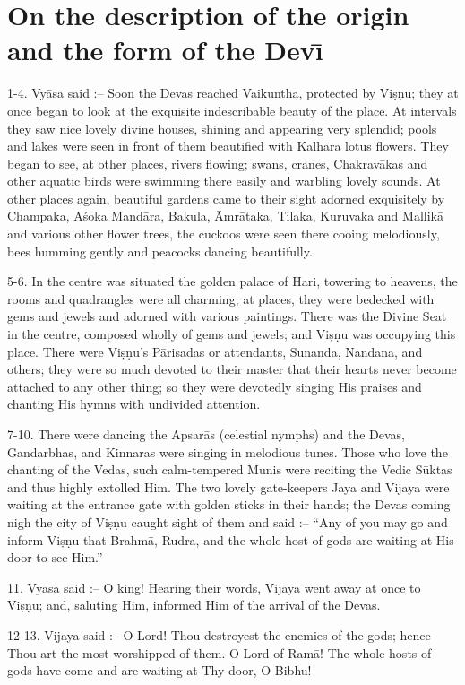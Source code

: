 \chapter{On the description of the origin and the form of the Dev\={\i}}

1-4. Vy\=asa said :-- Soon the Devas reached Vaikuntha, protected by Vi\d{s}\d{n}u; they at once began to look at the exquisite indescribable beauty of the place. At intervals they saw nice lovely divine houses, shining and appearing very splendid; pools and lakes were seen in front of them beautified with Kalh\=ara lotus flowers. They began to see, at other places, rivers flowing; swans, cranes, Chakrav\=akas and other aquatic birds were swimming there easily and warbling lovely sounds. At other places again, beautiful gardens came to their sight adorned exquisitely by Champaka, A\'soka Mand\=ara, Bakula, \=Amr\=ataka, Tilaka, Kuruvaka and Mallik\=a and various other flower trees, the cuckoos were seen there cooing melodiously, bees humming gently and peacocks dancing beautifully.

5-6. In the centre was situated the golden palace of Hari, towering to heavens, the rooms and quadrangles were all charming; at places, they were bedecked with gems and jewels and adorned with various paintings. There was the Divine Seat in the centre, composed wholly of gems and jewels; and Vi\d{s}\d{n}u was occupying this place. There were Vi\d{s}\d{n}u's P\=arisadas or attendants, Sunanda, Nandana, and others; they were so much devoted to their master that their hearts never become attached to any other thing; so they were devotedly singing His praises and chanting His hymns with undivided attention.

7-10. There were dancing the Apsar\=as (celestial nymphs) and the Devas, Gandarbhas, and Kinnaras were singing in melodious tunes. Those who love the chanting of the Vedas, such calm-tempered Munis were reciting the Vedic S\=uktas and thus highly extolled Him. The two lovely gate-keepers Jaya and Vijaya were waiting at the entrance gate with golden sticks in their hands; the Devas coming nigh the city of Vi\d{s}\d{n}u caught sight of them and said :-- ``Any of you may go and inform Vi\d{s}\d{n}u that Brahm\=a, Rudra, and the whole host of gods are waiting at His door to see Him.''

11. Vy\=asa said :-- O king! Hearing their words, Vijaya went away at once to Vi\d{s}\d{n}u; and, saluting Him, informed Him of the arrival of the Devas.

12-13. Vijaya said :-- O Lord! Thou destroyest the enemies of the gods; hence Thou art the most worshipped of them. O Lord of Ram\=a! The whole hosts of gods have come and are waiting at Thy door, O Bibhu!

